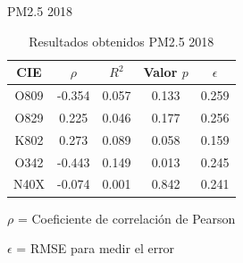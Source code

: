 \documentclass[11pt]{beamer}
\begin{document}
\begin{frame}{PM2.5 2018}
\begin{table}[hbt!]
\centering
\caption{Resultados obtenidos PM2.5 2018}
\label{tab:Resultados obtenidos PM2.5 2018}
\vspace{0.5cm}
\begin{tabular}{|c|c|c|c|c|}
	\hline
	CIE & $\rho$ & $R^2$ & Valor $p$ & $\epsilon$\\
	\hline
	O809 & -0.354 & 0.057 & 0.133 & 0.259 \\
	\hline
	O829 & 0.225 & 0.046 & 0.177 & 0.256 \\
	\hline
	K802 & 0.273 & 0.089 & 0.058 & 0.159 \\
	\hline
	O342 & -0.443 & 0.149 & 0.013 & 0.245 \\
	\hline
	N40X & -0.074 & 0.001 & 0.842 & 0.241 \\
	\hline
\end{tabular}
\footnotesize
\item{$\rho$ = Coeficiente de correlación de Pearson}
\item{$\epsilon$ = RMSE para medir el error}
\end{table}
\end{frame}
\end{document}
